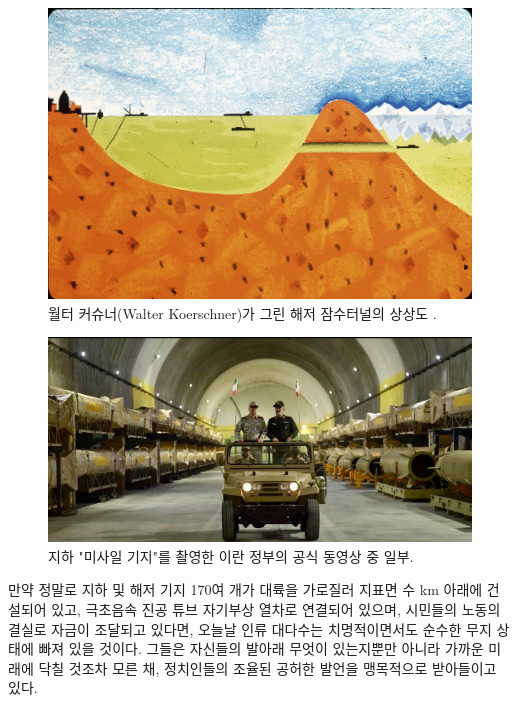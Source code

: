 \documentclass[10pt,twocolumn,letterpaper]{article}
\begin{document}
\begin{figure}[t]
\begin{center}
   \includegraphics[width=1\linewidth]{sub.jpg}
\end{center}
   \caption{월터 커슈너(Walter Koerschner)가 그린 해저 잠수터널의 상상도 \cite{22,23}.}
\label{fig:6}
\label{fig:onecol}
\end{figure}

\begin{figure}[t]
\begin{center}
   \includegraphics[width=1\linewidth]{iran.jpeg}
\end{center}
   \caption{지하 "미사일 기지"를 촬영한 이란 정부의 공식 동영상 중 일부\cite{39,40}.}
\label{fig:12}
\label{fig:onecol}
\end{figure}

만약 정말로 지하 및 해저 기지 170여 개가 대륙을 가로질러 지표면 수 km 아래에 건설되어 있고, 극초음속 진공 튜브 자기부상 열차로 연결되어 있으며, 시민들의 노동의 결실로 자금이 조달되고 있다면, 오늘날 인류 대다수는 치명적이면서도 순수한 무지 상태에 빠져 있을 것이다. 그들은 자신들의 발아래 무엇이 있는지뿐만 아니라 가까운 미래에 닥칠 것조차 모른 채, 정치인들의 조율된 공허한 발언을 맹목적으로 받아들이고 있다.
\end{document}

